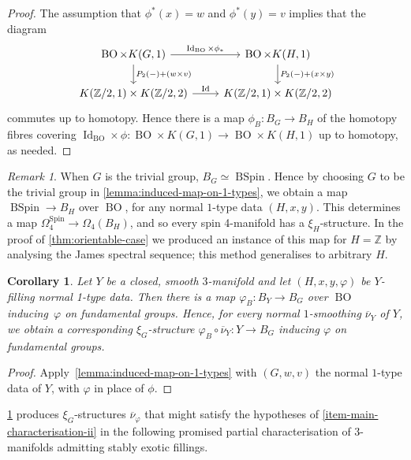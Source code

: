 \documentclass[a4paper, reqno]{amsart}
\newtheorem{corollary}[proposition]{Corollary}
\theoremstyle{definition}
\theoremstyle{remark}
\newtheorem{remark}[proposition]{Remark}
\newcommand{\Z}{\mathbb{Z}}
\newcommand{\id}{\operatorname{Id}}
\newcommand{\Spin}{\mathrm{Spin}}
\newcommand{\ol}{\overline}
\DeclareMathOperator{\BSpin}{BSpin}
\DeclareMathOperator{\BO}{BO}
\begin{document}
\begin{proof}
    The assumption that $\phi^*(x) = w$ and $\phi^*(y) = v$ implies that the diagram
    \[
    \begin{tikzcd}
        \BO\times K(G,1)\ar[r,"\id_{\BO}\times\phi_*"]\ar[d,"P_2(-) + (w \times v)"]&\BO\times K(H,1) \ar[d,"P_2(-) + (x \times y)"]\\
        K(\Z/2,1) \times K(\Z/2,2)\ar[r,"\id"]&K(\Z/2,1) \times K(\Z/2,2)
    \end{tikzcd}
    \]
    commutes up to homotopy. Hence there is a map $\phi_B \colon B_G \to B_H$ of the homotopy fibres covering $\id_{\BO} \times \phi \colon \BO \times K(G,1) \to \BO \times K(H,1)$ up to homotopy, as needed.
\end{proof}

\begin{remark}\label{rem:bspin-maps-to-BsubG}
When $G$ is the trivial group, $B_G\simeq \BSpin$. Hence by choosing $G$ to be the trivial group in \cref{lemma:induced-map-on-1-types}, we obtain a map $\BSpin\to B_H$ over $\BO$, for any normal $1$-type data $(H,x,y)$. This determines a map $\Omega_4^{\Spin} \to \Omega_4(B_H)$, and so every spin 4-manifold has a $\xi_H$-structure. In the proof of \cref{thm:orientable-case} we produced an instance of this map for $H=\Z$ by analysing the James spectral sequence; this method generalises to arbitrary $H$. 
\end{remark}

\begin{corollary}\label{cor:existence-varphi-B}
    Let $Y$ be a closed, smooth $3$-manifold and let $(H,x,y,\varphi)$ be $Y$-filling normal 1-type data. 
    Then there is a map $\varphi_B \colon B_Y \to B_G$ over $\BO$ inducing~$\varphi$ on fundamental groups.
Hence, for every normal $1$-smoothing $\ol{\nu}_Y$ of $Y$, we obtain a corresponding $\xi_G$-structure $\varphi_B \circ \ol{\nu}_Y \colon Y \to B_G$ inducing $\varphi$ on fundamental groups. 
\end{corollary}

\begin{proof}
    Apply~\cref{lemma:induced-map-on-1-types} with $(G,w,v)$ the normal $1$-type data of $Y$, with $\varphi$ in place of $\phi$.
\end{proof}

 \cref{cor:existence-varphi-B} produces $\xi_G$-structures $\ol{\nu}_{\varphi}$ that might satisfy the hypotheses of \eqref{item-main-characterisation-ii} in the following promised partial characterisation of $3$-manifolds admitting stably exotic fillings. 
\end{document}
